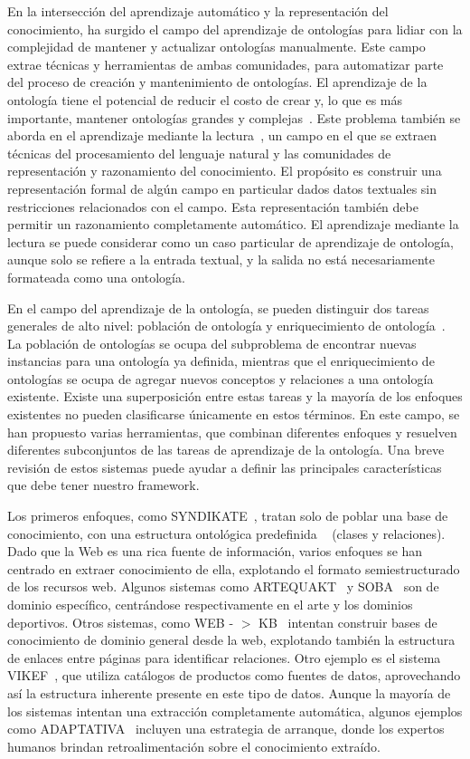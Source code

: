 En la intersección del aprendizaje automático y la representación del conocimiento, ha surgido el campo del aprendizaje de ontologías para lidiar con la complejidad de mantener y actualizar ontologías manualmente. Este campo extrae técnicas y herramientas de ambas comunidades, para automatizar parte del proceso de creación y mantenimiento de ontologías. El aprendizaje de la ontología tiene el potencial de reducir el costo de crear y, lo que es más importante, mantener ontologías grandes y complejas~\cite{cimiano2009ontology}. Este problema también se aborda en el aprendizaje mediante la lectura~\cite{barker2007learning}, un campo en el que se extraen técnicas del procesamiento del lenguaje natural y las comunidades de representación y razonamiento del conocimiento. El propósito es construir una representación formal de algún campo en particular dados datos textuales sin restricciones relacionados con el campo. Esta representación también debe permitir un razonamiento completamente automático. El aprendizaje mediante la lectura se puede considerar como un caso particular de aprendizaje de ontología, aunque solo se refiere a la entrada textual, y la salida no está necesariamente formateada como una ontología.

En el campo del aprendizaje de la ontología, se pueden distinguir dos tareas generales de alto nivel: población de ontología y enriquecimiento de ontología~\cite{petasis2011ontology}. La población de ontologías se ocupa del subproblema de encontrar nuevas instancias para una ontología ya definida, mientras que el enriquecimiento de ontologías se ocupa de agregar nuevos conceptos y relaciones a una ontología existente. Existe una superposición entre estas tareas y la mayoría de los enfoques existentes no pueden clasificarse únicamente en estos términos. En este campo, se han propuesto varias herramientas, que combinan diferentes enfoques y resuelven diferentes subconjuntos de las tareas de aprendizaje de la ontología. Una breve revisión de estos sistemas puede ayudar a definir las principales características que debe tener nuestro framework.

Los primeros enfoques, como SYNDIKATE~\cite{syndikate}, tratan solo de poblar una base de conocimiento, con una estructura ontológica predefinida ~ (clases y relaciones). Dado que la Web es una rica fuente de información, varios enfoques se han centrado en extraer conocimiento de ella, explotando el formato semiestructurado de los recursos web. Algunos sistemas como ARTEQUAKT~\cite{artequakt} y SOBA~\cite{soba} son de dominio específico, centrándose respectivamente en el arte y los dominios deportivos. Otros sistemas, como WEB - $> $ KB~\cite{webkb} intentan construir bases de conocimiento de dominio general desde la web, explotando también la estructura de enlaces entre páginas para identificar relaciones. Otro ejemplo es el sistema VIKEF~\cite{vikef}, que utiliza catálogos de productos como fuentes de datos, aprovechando así la estructura inherente presente en este tipo de datos. Aunque la mayoría de los sistemas intentan una extracción completamente automática, algunos ejemplos como ADAPTATIVA~\cite{adaptativa} incluyen una estrategia de arranque, donde los expertos humanos brindan retroalimentación sobre el conocimiento extraído.

